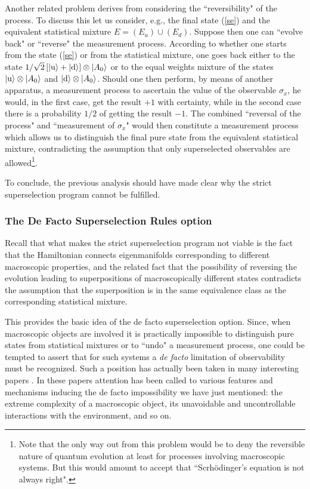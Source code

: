 \documentclass[12pt]{article}
\begin{document}
Another related problem derives from considering the
``reversibility" of the process. To discuss this let us consider,
e.g., the final state (\ref{se}) and the equivalent statistical
mixture $E=(E_{u})\cup (E_{d})$. Suppose then one can ``evolve
back" or ``reverse" the measurement process. According to whether
one starts from the state (\ref{se}) or from the statistical
mixture, one goes back either to the state
$1/\sqrt{2}\,[|\makebox{u}\rangle +
|\makebox{d}\rangle]\otimes|A_{0}\rangle$ or to the equal weights
mixture of the states $|\makebox{u}\rangle\otimes |A_{0}\rangle$
and $|\makebox{d}\rangle\otimes |A_{0}\rangle$. Should one then
perform, by means of another apparatus, a measurement process to
ascertain the value of the observable $\sigma_{x}$, he would, in
the first case, get the result $+1$ with certainty, while in the
second case there is a probability $1/2$ of getting the result
$-1$. The combined ``reversal of the process" and ``measurement of
$\sigma_{x}$" would then constitute a measurement process which
allows us to distinguish the final pure state from the equivalent
statistical mixture, contradicting the assumption that only
superselected observables are allowed\footnote {Note that the only way
out from this problem would be to deny the reversible nature of quantum
evolution at least for processes involving macroscopic systems. But this
would amount to accept that \cite{bells} ``Scrh\"{o}dinger's equation
is not always right".}.

To conclude, the previous analysis should have made clear why the
strict superselection  program cannot be fulfilled.


\subsubsection{The De Facto Superselection Rules option}
\label{sec332}

Recall that what makes the strict superselection program not
viable is the fact that the Hamiltonian connects eigenmanifolds
corresponding to different macroscopic properties, and the related
fact that the possibility of reversing the evolution leading to
superpositions of macroscopically different states contradicts the
assumption that the superposition is in the same equivalence class
as the corresponding statistical mixture.

This provides the basic idea of the de facto superselection
option. Since, when macroscopic objects are involved it is
practically impossible to distinguish pure states from statistical
mixtures or to ``undo" a measurement process, one could be tempted
to assert that for such systems a {\it de facto} limitation of
observability must be recognized. Such a position has actually
been taken in many interesting papers \cite{dlp,got,zur1,zu,jz}.
In these papers attention has been called to various features and
mechanisms inducing the de facto impossibility we have just
mentioned: the extreme complexity of a macroscopic object, its
unavoidable and uncontrollable interactions with the environment,
and so on.
\end{document}
